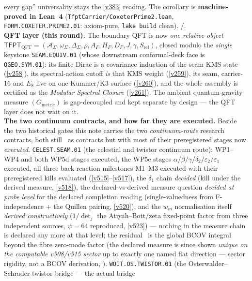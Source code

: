 \documentclass[11pt,a4paper]{article}
\begin{document}
\begin{keybox}
every gap'' universality stays the \vref{v383} reading. The corollary is \textbf{machine-proved in Lean~4}
(\texttt{TfptCarrier/CoxeterPrime2.lean}, \texttt{FORM.COXETER.PRIME2.01}: axiom-pure, \texttt{lake build}
clean). \mE/\mC.
\smallskip\\
\noindent\textbf{QFT layer (this round).} The boundary QFT is now \emph{one relative object}
$\mathsf{TFPT}_{\mathrm{QFT}}=(\mathcal A_\Sigma,\omega_\Sigma,\Delta_\Sigma,\rho,A_F,H_F,D_F,J,\gamma,
S_{\mathrm{rel}})$, closed modulo the \emph{single} keystone \texttt{SEAM.EQUIV.01} (whose downstream
conformal-deck face is \texttt{QGEO.SYM.01}): its finite Dirac is a
covariance induction of the seam KMS state (\vref{v258}), its spectral-action cutoff \emph{is} that KMS
weight (\vref{v259}), its seam, carrier-$16$ and $E_8$ live on one Kummer/K3 surface (\vref{v260}), and the
whole assembly is certified as the \emph{Modular Spectral Closure} (\vref{v261}). The ambient
quantum-gravity measure $(G_{\mathrm{metric}})$ is gap-decoupled and kept separate by design --- the QFT
layer does not wait on it.
\smallskip\\
\noindent\textbf{The two continuum contracts, and how far they are executed.} Beside the two
historical gates this note carries the two \emph{continuum-route} research contracts, both still
\mO\ as contracts but with most of their preregistered stages now \emph{executed}.
\texttt{CELEST.SEAM.01} (the celestial and twistor continuum route): WP1--WP4 and both WP5d
stages executed, the WP5e stages $\alpha/\beta/\gamma/\delta_2/\varepsilon_2/\varepsilon_1$
executed, all three back-reaction milestones M1--M3 executed with their preregistered kills
evaluated (\vref{v515}--\vref{v517}), the $\delta_1$ chain \emph{decided} (kill under the
derived measure, \vref{v518}), the declared-vs-derived measure question \emph{decided at probe
level} for the declared completion reading (single-valuedness from F-independence $+$ the
Quillen pairing, \vref{v520}), and the $w_m$ normalisation itself \emph{derived constructively}
($1/\det_j$ the Atiyah--Bott/zeta fixed-point factor from three independent sources, $\psi=64$
reproduced, \vref{v523}) --- nothing in the measure chain is declared any more at that level;
the residual \mO\ is the global BCOV integral beyond the fibre zero-mode factor (the declared
measure is since shown \emph{unique on the computable v508/v515 sector} up to exactly one
named flat direction --- sector rigidity, not a BCOV derivation,
).
\texttt{WOIT.OS.TWISTOR.01} (the Osterwalder--Schrader twistor bridge --- the actual bridge

\end{keybox}
\end{document}
